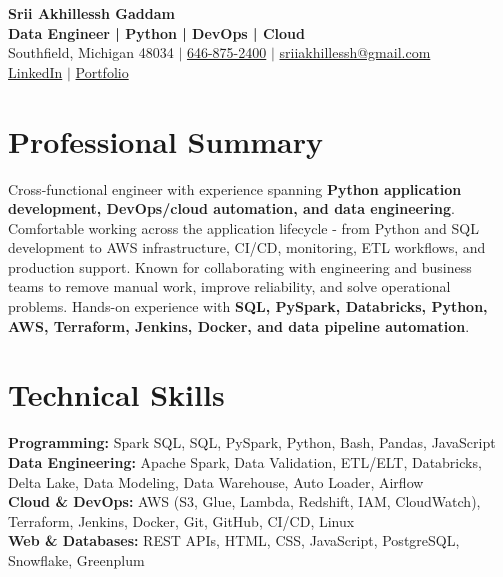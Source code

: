 \documentclass[letterpaper,10pt]{article}
\begin{document}
\fontsize{9.35pt}{10.45pt}\selectfont

\begin{center}
    {\LARGE \textbf{Srii Akhillessh Gaddam}} \\[-1pt]
    \textbf{Data Engineer | Python | DevOps | Cloud} \\[2pt]
    Southfield, Michigan 48034 $|$
    \href{tel:6468752400}{646-875-2400} $|$
    \href{mailto:sriiakhillessh@gmail.com}{sriiakhillessh@gmail.com} \\[1pt]
    \href{https://www.linkedin.com/in/srii-akhiilessh-gaddam-b48668191/}{LinkedIn} $|$
    \href{https://sriiakhillesshg.github.io/portfolio/}{Portfolio}
\end{center}
\vspace{-8pt}

\section{Professional Summary}
\small{Cross-functional engineer with experience spanning \textbf{Python application development, DevOps/cloud automation, and data engineering}. Comfortable working across the application lifecycle - from Python and SQL development to AWS infrastructure, CI/CD, monitoring, ETL workflows, and production support. Known for collaborating with engineering and business teams to remove manual work, improve reliability, and solve operational problems. Hands-on experience with \textbf{SQL, PySpark, Databricks, Python, AWS, Terraform, Jenkins, Docker, and data pipeline automation}.}

\section{Technical Skills}
\small{
\textbf{Programming:} Spark SQL, SQL, PySpark, Python, Bash, Pandas, JavaScript \\
\textbf{Data Engineering:} Apache Spark, Data Validation, ETL/ELT, Databricks, Delta Lake, Data Modeling, Data Warehouse, Auto Loader, Airflow \\
\textbf{Cloud \& DevOps:} AWS (S3, Glue, Lambda, Redshift, IAM, CloudWatch), Terraform, Jenkins, Docker, Git, GitHub, CI/CD, Linux \\
\textbf{Web \& Databases:} REST APIs, HTML, CSS, JavaScript, PostgreSQL, Snowflake, Greenplum
}
\end{document}
